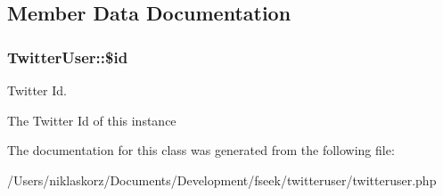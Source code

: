 \subsection{Member Data Documentation}
\hypertarget{class_twitter_user_4096acd6dd8fdc48d8d3523807fb3bef}{
\subsubsection[{\$id}]{\setlength{\rightskip}{0pt plus 5cm}TwitterUser::\$id}}
\label{class_twitter_user_4096acd6dd8fdc48d8d3523807fb3bef}


Twitter Id. 

The Twitter Id of this instance 

The documentation for this class was generated from the following file:\begin{CompactItemize}
\item 
/Users/niklaskorz/Documents/Development/fseek/twitteruser/twitteruser.php\end{CompactItemize}
